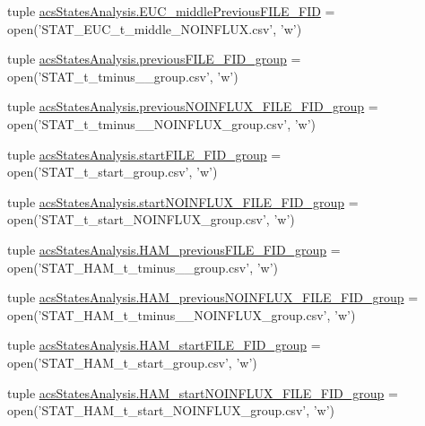 \begin{DoxyCompactItemize}
\item 
tuple \hyperlink{a00132_afcb9ec3ed11cfcacae8f796af7605425}{acs\+States\+Analysis.\+E\+U\+C\+\_\+middle\+Previous\+F\+I\+L\+E\+\_\+\+F\+I\+D} = open('S\+T\+A\+T\+\_\+\+E\+U\+C\+\_\+t\+\_\+middle\+\_\+\+N\+O\+I\+N\+F\+L\+U\+X.\+csv', 'w')
\item 
tuple \hyperlink{a00132_a9e72c152be1f5aac24af10b353b16390}{acs\+States\+Analysis.\+previous\+F\+I\+L\+E\+\_\+\+F\+I\+D\+\_\+group} = open('S\+T\+A\+T\+\_\+t\+\_\+tminus\+\_\+\_\+group.\+csv', 'w')
\item 
tuple \hyperlink{a00132_a648b56a19ba8992cdb56d307ed22eb41}{acs\+States\+Analysis.\+previous\+N\+O\+I\+N\+F\+L\+U\+X\+\_\+\+F\+I\+L\+E\+\_\+\+F\+I\+D\+\_\+group} = open('S\+T\+A\+T\+\_\+t\+\_\+tminus\+\_\+\_\+\+N\+O\+I\+N\+F\+L\+U\+X\+\_\+group.\+csv', 'w')
\item 
tuple \hyperlink{a00132_addede16e21598cc53c446efa66bd20d9}{acs\+States\+Analysis.\+start\+F\+I\+L\+E\+\_\+\+F\+I\+D\+\_\+group} = open('S\+T\+A\+T\+\_\+t\+\_\+start\+\_\+group.\+csv', 'w')
\item 
tuple \hyperlink{a00132_a14eebfeaac72a017ee76d69b55033042}{acs\+States\+Analysis.\+start\+N\+O\+I\+N\+F\+L\+U\+X\+\_\+\+F\+I\+L\+E\+\_\+\+F\+I\+D\+\_\+group} = open('S\+T\+A\+T\+\_\+t\+\_\+start\+\_\+\+N\+O\+I\+N\+F\+L\+U\+X\+\_\+group.\+csv', 'w')
\item 
tuple \hyperlink{a00132_aa72272e636b1eafe39ed3367145433f2}{acs\+States\+Analysis.\+H\+A\+M\+\_\+previous\+F\+I\+L\+E\+\_\+\+F\+I\+D\+\_\+group} = open('S\+T\+A\+T\+\_\+\+H\+A\+M\+\_\+t\+\_\+tminus\+\_\+\_\+group.\+csv', 'w')
\item 
tuple \hyperlink{a00132_a092676cc95ddff57aac2aa077ce22d52}{acs\+States\+Analysis.\+H\+A\+M\+\_\+previous\+N\+O\+I\+N\+F\+L\+U\+X\+\_\+\+F\+I\+L\+E\+\_\+\+F\+I\+D\+\_\+group} = open('S\+T\+A\+T\+\_\+\+H\+A\+M\+\_\+t\+\_\+tminus\+\_\+\_\+\+N\+O\+I\+N\+F\+L\+U\+X\+\_\+group.\+csv', 'w')
\item 
tuple \hyperlink{a00132_ab74ecb2bab6a84c44274814862f2e96c}{acs\+States\+Analysis.\+H\+A\+M\+\_\+start\+F\+I\+L\+E\+\_\+\+F\+I\+D\+\_\+group} = open('S\+T\+A\+T\+\_\+\+H\+A\+M\+\_\+t\+\_\+start\+\_\+group.\+csv', 'w')
\item 
tuple \hyperlink{a00132_a4652c6dad393663e40970d7f6422c1d6}{acs\+States\+Analysis.\+H\+A\+M\+\_\+start\+N\+O\+I\+N\+F\+L\+U\+X\+\_\+\+F\+I\+L\+E\+\_\+\+F\+I\+D\+\_\+group} = open('S\+T\+A\+T\+\_\+\+H\+A\+M\+\_\+t\+\_\+start\+\_\+\+N\+O\+I\+N\+F\+L\+U\+X\+\_\+group.\+csv', 'w')
\item 

\end{DoxyCompactItemize}
